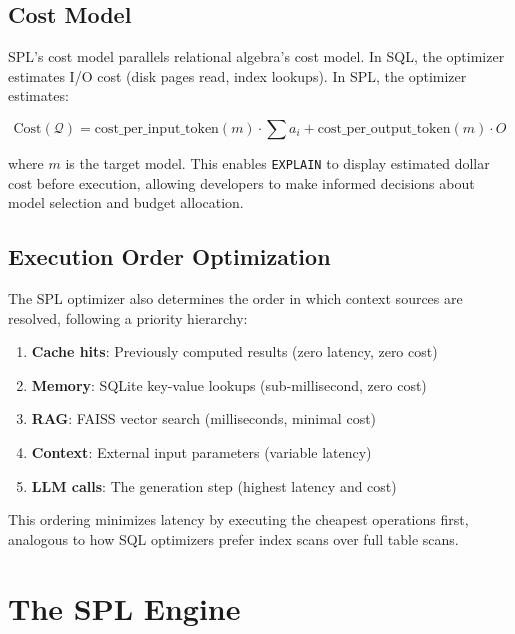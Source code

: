 \documentclass[11pt,a4paper]{article}
\begin{document}
\subsection{Cost Model}

SPL's cost model parallels relational algebra's cost model. In SQL, the optimizer estimates I/O cost (disk pages read, index lookups). In SPL, the optimizer estimates:

\begin{equation}
\text{Cost}(\mathcal{Q}) = \text{cost\_per\_input\_token}(m) \cdot \sum a_i + \text{cost\_per\_output\_token}(m) \cdot O
\end{equation}

where $m$ is the target model. This enables \texttt{EXPLAIN} to display estimated dollar cost before execution, allowing developers to make informed decisions about model selection and budget allocation.

\subsection{Execution Order Optimization}

The SPL optimizer also determines the order in which context sources are resolved, following a priority hierarchy:

\begin{enumerate}[nosep]
  \item \textbf{Cache hits}: Previously computed results (zero latency, zero cost)
  \item \textbf{Memory}: SQLite key-value lookups (sub-millisecond, zero cost)
  \item \textbf{RAG}: FAISS vector search (milliseconds, minimal cost)
  \item \textbf{Context}: External input parameters (variable latency)
  \item \textbf{LLM calls}: The generation step (highest latency and cost)
\end{enumerate}

This ordering minimizes latency by executing the cheapest operations first, analogous to how SQL optimizers prefer index scans over full table scans.

\section{The SPL Engine}
\label{sec:engine}
\end{document}

